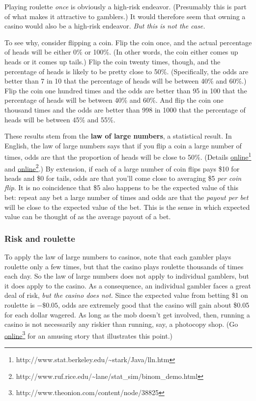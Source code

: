 Playing roulette \emph{once} is obviously a high-risk endeavor. (Presumably this is part of what makes it attractive to gamblers.)  It would therefore seem that owning a casino would also be a high-risk endeavor. \emph{But this is not the case.}

To see why, consider flipping a coin. Flip the coin once, and the actual percentage of heads will be either 0\% or 100\%. (In other words, the coin either comes up heads or it comes up tails.) Flip the coin twenty times, though, and the percentage of heads is likely to be pretty close to 50\%. (Specifically, the odds are better than 7 in 10 that the percentage of heads will be between 40\% and 60\%.) Flip the coin one hundred times and the odds are better than 95 in 100 that the percentage of heads will be between 40\% and 60\%. And flip the coin one thousand times and the odds are better than 998 in 1000 that the percentage of heads will be between 45\% and 55\%.

These results stem from the \textbf{law of large numbers}, a statistical result. In English, the law of large numbers says that if you flip a coin a large number of times, odds are that the proportion of heads will be close to 50\%. (Details \href{http://www.stat.berkeley.edu/~stark/Java/lln.htm}{online}\footnote{http://www.stat.berkeley.edu/\~{}stark/Java/lln.htm} and \href{http://www.ruf.rice.edu/~lane/stat_sim/binom_demo.html}{online}\footnote{http://www.ruf.rice.edu/\~{}lane/stat\_sim/binom\_demo.html}.) %
By extension, if each of a large number of coin flips pays \$10 for heads and \$0 for tails, odds are that you'll come close to averaging \$5 \emph{per coin flip}. It is no coincidence that \$5 also happens to be the expected value of this bet: repeat any bet a large number of times and odds are that the \emph{payout per bet} will be close to the expected value of the bet. This is the sense in which expected value can be thought of as the average payout of a bet.

\subsubsection{Risk and roulette}

To apply the law of large numbers to casinos, note that each gambler plays roulette only a few times, but that the casino plays roulette thousands of times each day. So the law of large numbers does not apply to individual gamblers, but it does apply to the casino. As a consequence, an individual gambler faces a great deal of risk, \emph{but the casino does not.} Since the expected value from betting \$1 on roulette is $-\$0.05$, odds are extremely good that the casino will gain about \$0.05 for each dollar wagered. As long as the mob doesn't get involved, then, running a casino is not necessarily any riskier than running, say, a photocopy shop. (Go \href{http://www.theonion.com/content/node/38825}{online}\footnote{http://www.theonion.com/content/node/38825} for an amusing story that illustrates this point.)

